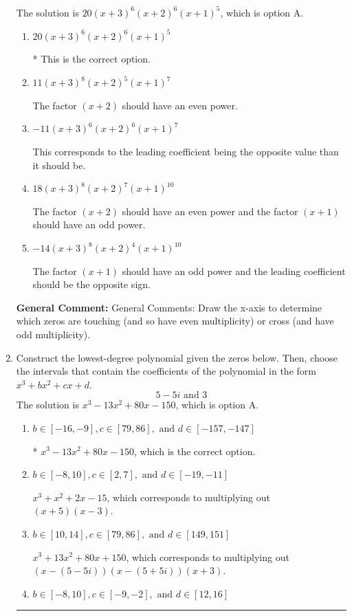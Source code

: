 \documentclass{extbook}[14pt]
\newcommand{\litem}[1]{\item #1

\rule{\textwidth}{0.4pt}}
\begin{document}
\begin{enumerate}
{The solution is \( 20(x + 3)^{6} (x + 2)^{6} (x + 1)^{5} \), which is option A.\begin{enumerate}[label=\Alph*.]
\item \( 20(x + 3)^{6} (x + 2)^{6} (x + 1)^{5} \)

* This is the correct option.
\item \( 11(x + 3)^{8} (x + 2)^{5} (x + 1)^{7} \)

The factor $(x + 2)$ should have an even power.
\item \( -11(x + 3)^{6} (x + 2)^{6} (x + 1)^{7} \)

This corresponds to the leading coefficient being the opposite value than it should be.
\item \( 18(x + 3)^{8} (x + 2)^{7} (x + 1)^{10} \)

The factor $(x + 2)$ should have an even power and the factor $(x + 1)$ should have an odd power.
\item \( -14(x + 3)^{8} (x + 2)^{4} (x + 1)^{10} \)

The factor $(x + 1)$ should have an odd power and the leading coefficient should be the opposite sign.
\end{enumerate}

\textbf{General Comment:} General Comments: Draw the x-axis to determine which zeros are touching (and so have even multiplicity) or cross (and have odd multiplicity).
}
\litem{
Construct the lowest-degree polynomial given the zeros below. Then, choose the intervals that contain the coefficients of the polynomial in the form $x^3+bx^2+cx+d$.
\[ 5 - 5 i \text{ and } 3 \]The solution is \( x^{3} -13 x^{2} +80 x -150 \), which is option A.\begin{enumerate}[label=\Alph*.]
\item \( b \in [-16, -9], c \in [79, 86], \text{ and } d \in [-157, -147] \)

* $x^{3} -13 x^{2} +80 x -150$, which is the correct option.
\item \( b \in [-8, 10], c \in [2, 7], \text{ and } d \in [-19, -11] \)

$x^{3} + x^{2} +2 x -15$, which corresponds to multiplying out $(x + 5)(x -3)$.
\item \( b \in [10, 14], c \in [79, 86], \text{ and } d \in [149, 151] \)

$x^{3} +13 x^{2} +80 x + 150$, which corresponds to multiplying out $(x-(5 - 5 i))(x-(5 + 5 i))(x + 3)$.
\item \( b \in [-8, 10], c \in [-9, -2], \text{ and } d \in [12, 16] \)


\end{enumerate}}
\end{enumerate}
\end{document}

